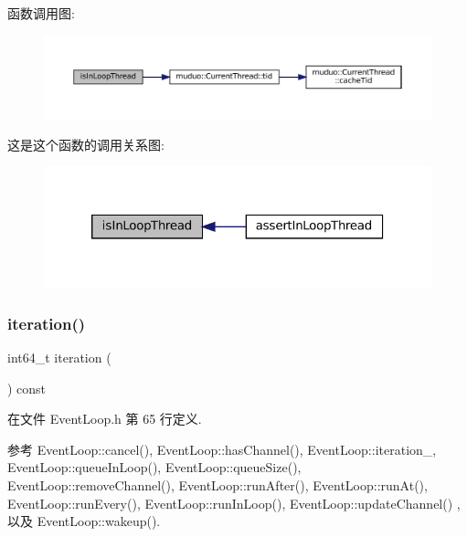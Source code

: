 函数调用图\+:
\nopagebreak
\begin{figure}[H]
\begin{center}
\leavevmode
\includegraphics[width=350pt]{classmuduo_1_1net_1_1EventLoop_a1da5ae1e094c0136136b5344ef7a3b66_cgraph}
\end{center}
\end{figure}
这是这个函数的调用关系图\+:
\nopagebreak
\begin{figure}[H]
\begin{center}
\leavevmode
\includegraphics[width=320pt]{classmuduo_1_1net_1_1EventLoop_a1da5ae1e094c0136136b5344ef7a3b66_icgraph}
\end{center}
\end{figure}
\mbox{\label{classmuduo_1_1net_1_1EventLoop_a1cee21cf429a898323eb98258939a4dc}} 
\subsubsection{\texorpdfstring{iteration()}{iteration()}}
{\footnotesize\ttfamily int64\+\_\+t iteration (\begin{DoxyParamCaption}{ }\end{DoxyParamCaption}) const\hspace{0.3cm}{\ttfamily [inline]}}



在文件 Event\+Loop.\+h 第 65 行定义.



参考 Event\+Loop\+::cancel(), Event\+Loop\+::has\+Channel(), Event\+Loop\+::iteration\+\_\+, Event\+Loop\+::queue\+In\+Loop(), Event\+Loop\+::queue\+Size(), Event\+Loop\+::remove\+Channel(), Event\+Loop\+::run\+After(), Event\+Loop\+::run\+At(), Event\+Loop\+::run\+Every(), Event\+Loop\+::run\+In\+Loop(), Event\+Loop\+::update\+Channel() , 以及 Event\+Loop\+::wakeup().

